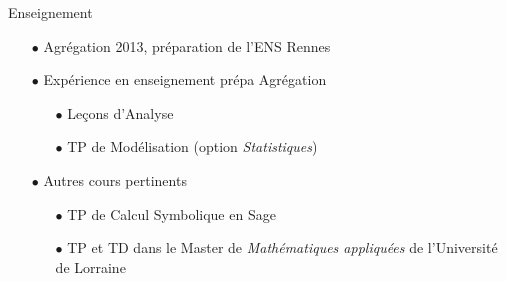 \begin{frame}{Enseignement}

\begin{itemize}
\item[$\bullet$] Agr\'egation 2013, pr\'eparation de l'ENS Rennes
\vfill
\item[$\bullet$] Exp\'erience en enseignement pr\'epa Agr\'egation
\vfill
\begin{itemize}
\item[$\bullet$] Le\c{c}ons d'Analyse 
\vfill
\item[$\bullet$] TP de Mod\'elisation (option \textit{Statistiques}) 
\vfill
\end{itemize}
\item[$\bullet$] Autres cours pertinents
\vfill
\begin{itemize}
\item[$\bullet$] TP de Calcul Symbolique en Sage 
\vfill
\item[$\bullet$] TP et TD dans le Master de \textit{Math\'ematiques appliqu\'ees} de l'Universit\'e de Lorraine 
\vfill
\end{itemize}
\end{itemize}

\end{frame}